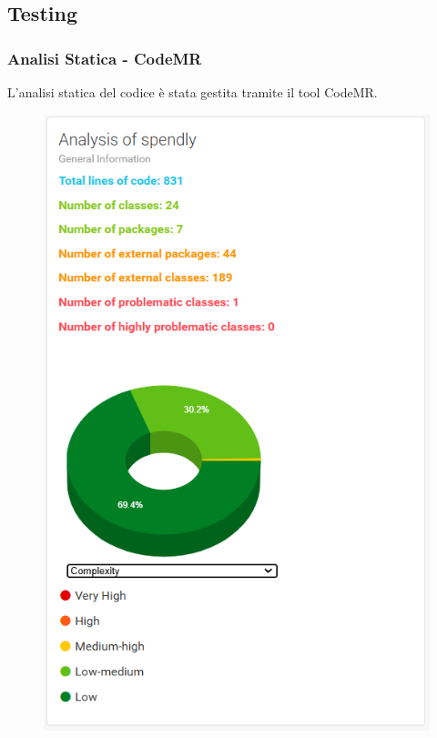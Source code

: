 \subsection{Testing}
\subsubsection{Analisi Statica - CodeMR}

L'analisi statica del codice è stata gestita tramite il tool CodeMR.

\begin{figure}[H]
    \centering
    \begin{minipage}{0.45\textwidth}
        \centering
        \includegraphics[width=\textwidth]{images/complexity_iter1.png}

\end{minipage}
\end{figure}
